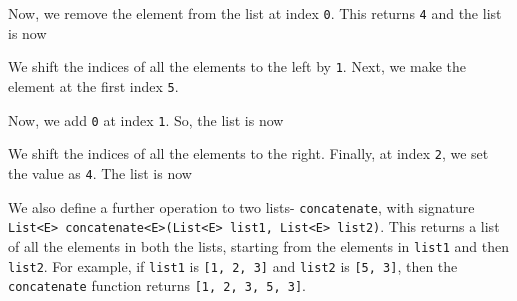 \documentclass[a4paper, openany]{memoir}
\begin{document}
\begin{center}
\end{center}
Now, we remove the element from the list at index \texttt{0}. This returns \texttt{4} and the list is now
\begin{center}
\end{center}
We shift the indices of all the elements to the left by \texttt{1}. Next, we make the element at the first index \texttt{5}.
\begin{center}
\end{center}
Now, we add \texttt{0} at index \texttt{1}. So, the list is now
\begin{center}
\end{center}
We shift the indices of all the elements to the right. Finally, at index \texttt{2}, we set the value as \texttt{4}. The list is now
\begin{center}
\end{center}
\noindent We also define a further operation to two lists- \texttt{concatenate}, with signature \texttt{List<E> concatenate<E>(List<E> list1, List<E> list2)}. This returns a list of all the elements in both the lists, starting from the elements in \texttt{list1} and then \texttt{list2}. For example, if \texttt{list1} is \texttt{[1, 2, 3]} and \texttt{list2} is \texttt{[5, 3]}, then the \texttt{concatenate} function returns \texttt{[1, 2, 3, 5, 3]}.
\end{document}
